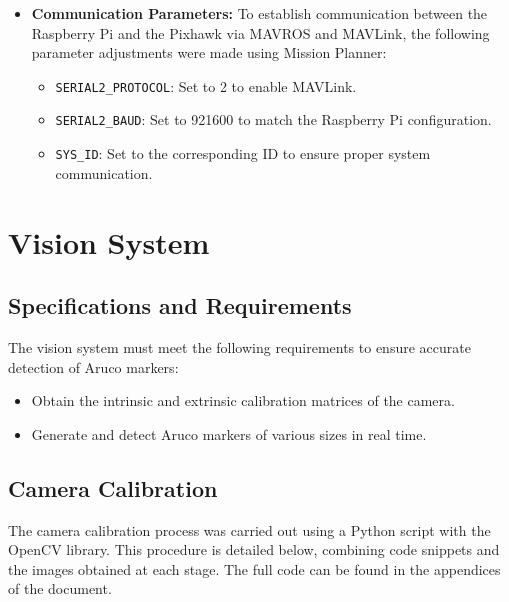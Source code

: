 \begin{itemize}
    \item \textbf{Communication Parameters:} 
    To establish communication between the Raspberry Pi and the Pixhawk via MAVROS and MAVLink, the following parameter adjustments were made using Mission Planner:
    \begin{itemize}
        \item \texttt{SERIAL2\_PROTOCOL}: Set to 2 to enable MAVLink.
        \item \texttt{SERIAL2\_BAUD}: Set to 921600 to match the Raspberry Pi configuration.
        \item \texttt{SYS\_ID}: Set to the corresponding ID to ensure proper system communication.
    \end{itemize}
\end{itemize}

\section{Vision System}
\subsection{Specifications and Requirements} 
The vision system must meet the following requirements to ensure accurate detection of Aruco markers:
    \begin{itemize}
        \item Obtain the intrinsic and extrinsic calibration matrices of the camera.
        \item Generate and detect Aruco markers of various sizes in real time.
    \end{itemize}

\subsection{Camera Calibration} 
The camera calibration process was carried out using a Python script with the OpenCV library. This procedure is detailed below, combining code snippets and the images obtained at each stage. The full code can be found in the appendices of the document.


